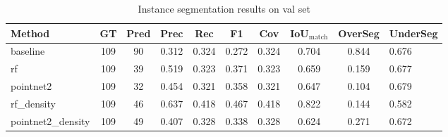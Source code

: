 \begin{table}[htbp]
\centering
\caption{Instance segmentation results on val set}
\begin{tabular}{l c c c c c c c c}
\hline
Method & GT & Pred & Prec & Rec & F1 & Cov & IoU$_{\text{match}}$ & OverSeg & UnderSeg \\
\hline
baseline & 109 & 90 & 0.312 & 0.324 & 0.272 & 0.324 & 0.704 & 0.844 & 0.676 \\
rf & 109 & 39 & 0.519 & 0.323 & 0.371 & 0.323 & 0.659 & 0.159 & 0.677 \\
pointnet2 & 109 & 32 & 0.454 & 0.321 & 0.358 & 0.321 & 0.647 & 0.104 & 0.679 \\
rf_density & 109 & 46 & 0.637 & 0.418 & 0.467 & 0.418 & 0.822 & 0.144 & 0.582 \\
pointnet2_density & 109 & 49 & 0.407 & 0.328 & 0.338 & 0.328 & 0.624 & 0.271 & 0.672 \\
\hline
\end{tabular}
\end{table}
